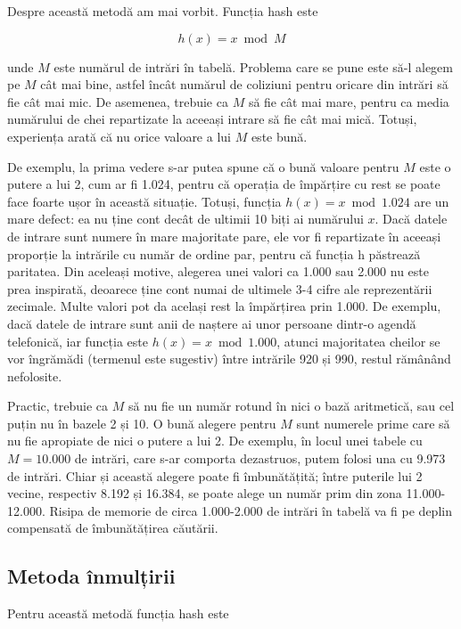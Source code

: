 Despre această metodă am mai vorbit. Funcția hash este

\begin{equation}
  h(x)=x \bmod M
\end{equation}

unde $M$ este numărul de intrări în tabelă. Problema care se pune este să-l
alegem pe $M$ cât mai bine, astfel încât numărul de coliziuni pentru oricare
din intrări să fie cât mai mic. De asemenea, trebuie ca $M$ să fie cât mai
mare, pentru ca media numărului de chei repartizate la aceeași intrare să fie
cât mai mică. Totuși, experiența arată că nu orice valoare a lui $M$ este
bună.

De exemplu, la prima vedere s-ar putea spune că o bună valoare pentru $M$ este
o putere a lui 2, cum ar fi 1.024, pentru că operația de împărțire cu rest se
poate face foarte ușor în această situație. Totuși, funcția $h(x)=x \bmod
1.024$ are un mare defect: ea nu ține cont decât de ultimii 10 biți ai
numărului $x$. Dacă datele de intrare sunt numere în mare majoritate pare, ele
vor fi repartizate în aceeași proporție la intrările cu număr de ordine par,
pentru că funcția h păstrează paritatea. Din aceleași motive, alegerea unei
valori ca 1.000 sau 2.000 nu este prea inspirată, deoarece ține cont numai de
ultimele 3-4 cifre ale reprezentării zecimale. Multe valori pot da același
rest la împărțirea prin 1.000. De exemplu, dacă datele de intrare sunt anii de
naștere ai unor persoane dintr-o agendă telefonică, iar funcția este $h(x)=x
\bmod 1.000$, atunci majoritatea cheilor se vor îngrămădi (termenul este
sugestiv) între intrările 920 și 990, restul rămânând nefolosite.

Practic, trebuie ca $M$ să nu fie un număr rotund în nici o bază aritmetică,
sau cel puțin nu în bazele 2 și 10. O bună alegere pentru $M$ sunt numerele
prime care să nu fie apropiate de nici o putere a lui 2. De exemplu, în locul
unei tabele cu $M=10.000$ de intrări, care s-ar comporta dezastruos, putem
folosi una cu 9.973 de intrări. Chiar și această alegere poate fi
îmbunătățită; între puterile lui 2 vecine, respectiv 8.192 și 16.384, se poate
alege un număr prim din zona 11.000-12.000. Risipa de memorie de circa
1.000-2.000 de intrări în tabelă va fi pe deplin compensată de îmbunătățirea
căutării.

\subsection{Metoda înmulțirii}

Pentru această metodă funcția hash este

